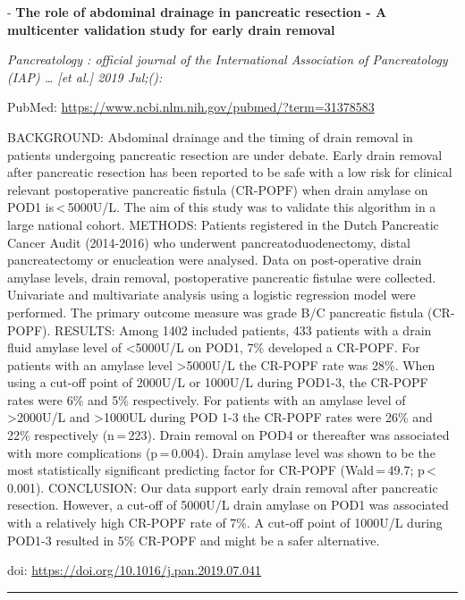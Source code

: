 \documentclass[]{article}
\begin{document}
 - \textbf{The role of abdominal drainage in pancreatic resection - A
multicenter validation study for early drain removal}

\emph{Pancreatology : official journal of the International Association
of Pancreatology (IAP) \ldots{} {[}et al.{]} 2019 Jul;():}

PubMed: \url{https://www.ncbi.nlm.nih.gov/pubmed/?term=31378583}

BACKGROUND: Abdominal drainage and the timing of drain removal in
patients undergoing pancreatic resection are under debate. Early drain
removal after pancreatic resection has been reported to be safe with a
low risk for clinical relevant postoperative pancreatic fistula
(CR-POPF) when drain amylase on POD1 is\,\textless{}\,5000U/L. The aim
of this study was to validate this algorithm in a large national cohort.
METHODS: Patients registered in the Dutch Pancreatic Cancer Audit
(2014-2016) who underwent pancreatoduodenectomy, distal pancreatectomy
or enucleation were analysed. Data on post-operative drain amylase
levels, drain removal, postoperative pancreatic fistulae were collected.
Univariate and multivariate analysis using a logistic regression model
were performed. The primary outcome measure was grade B/C pancreatic
fistula (CR-POPF). RESULTS: Among 1402 included patients, 433 patients
with a drain fluid amylase level of \textless{}5000U/L on POD1, 7\%
developed a CR-POPF. For patients with an amylase level
\textgreater{}5000U/L the CR-POPF rate was 28\%. When using a cut-off
point of 2000U/L or 1000U/L during POD1-3, the CR-POPF rates were 6\%
and 5\% respectively. For patients with an amylase level of
\textgreater{}2000U/L and \textgreater{}1000UL during POD 1-3 the
CR-POPF rates were 26\% and 22\% respectively (n\,=\,223). Drain removal
on POD4 or thereafter was associated with more complications
(p\,=\,0.004). Drain amylase level was shown to be the most
statistically significant predicting factor for CR-POPF (Wald\,=\,49.7;
p\,\textless{}\,0.001). CONCLUSION: Our data support early drain removal
after pancreatic resection. However, a cut-off of 5000U/L drain amylase
on POD1 was associated with a relatively high CR-POPF rate of 7\%. A
cut-off point of 1000U/L during POD1-3 resulted in 5\% CR-POPF and might
be a safer alternative.

doi: \url{https://doi.org/10.1016/j.pan.2019.07.041}

{}

{}

\begin{center}\rule{0.5\linewidth}{\linethickness}\end{center}
\end{document}
